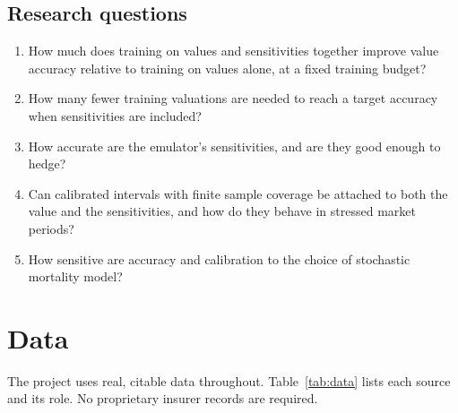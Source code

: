 \documentclass[12pt,a4paper]{article}
\begin{document}
\subsection{Research questions}
\begin{enumerate}[label=RQ\arabic*.,leftmargin=*]
\item How much does training on values and sensitivities together improve value accuracy relative to training on values alone, at a fixed training budget?
\item How many fewer training valuations are needed to reach a target accuracy when sensitivities are included?
\item How accurate are the emulator's sensitivities, and are they good enough to hedge?
\item Can calibrated intervals with finite sample coverage be attached to both the value and the sensitivities, and how do they behave in stressed market periods?
\item How sensitive are accuracy and calibration to the choice of stochastic mortality model?
\end{enumerate}

\section{Data}\label{sec:data}
The project uses real, citable data throughout. Table~\ref{tab:data} lists each source and its role. No proprietary insurer records are required.
\end{document}

